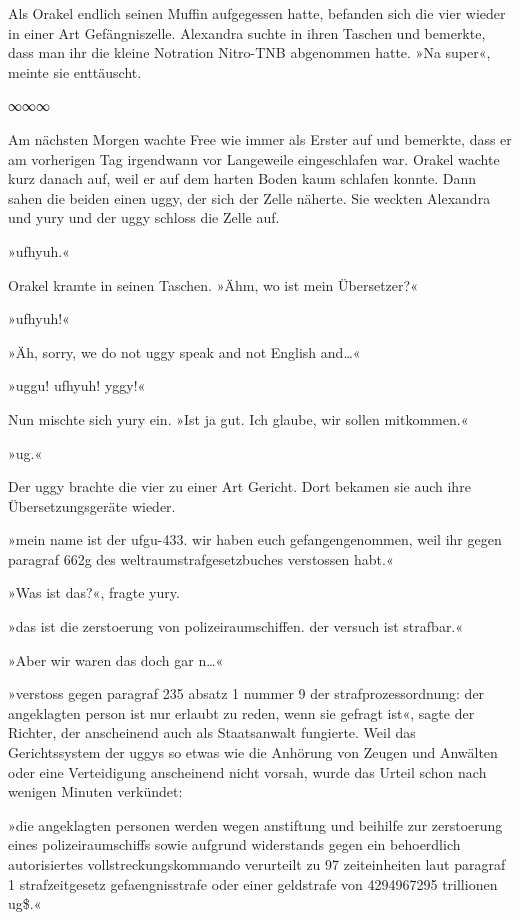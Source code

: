 Als Orakel endlich seinen Muffin aufgegessen hatte, befanden sich die vier wieder in einer Art Gefängniszelle. Alexandra suchte in ihren Taschen und bemerkte, dass man ihr die kleine Notration Nitro-TNB abgenommen hatte. »Na super«, meinte sie enttäuscht.

\begin{center}
    ∞∞∞
\end{center}

Am nächsten Morgen wachte Free wie immer als Erster auf und bemerkte, dass er am vorherigen Tag irgendwann vor Langeweile eingeschlafen war. Orakel wachte kurz danach auf, weil er auf dem harten Boden kaum schlafen konnte. Dann sahen die beiden einen uggy, der sich der Zelle näherte. Sie weckten Alexandra und yury und der uggy schloss die Zelle auf.

»ufhyuh.«

Orakel kramte in seinen Taschen. »Ähm, wo ist mein Übersetzer?«

»ufhyuh!«

»Äh, sorry, we do not uggy speak and not English and…«

»uggu! ufhyuh! yggy!«

Nun mischte sich yury ein. »Ist ja gut. Ich glaube, wir sollen mitkommen.«

»ug.«

Der uggy brachte die vier zu einer Art Gericht. Dort bekamen sie auch ihre Übersetzungsgeräte wieder.

»mein name ist der ufgu-433. wir haben euch gefangengenommen, weil ihr gegen paragraf 662g des weltraumstrafgesetzbuches verstossen habt.«

»Was ist das?«, fragte yury.

»das ist die zerstoerung von polizeiraumschiffen. der versuch ist strafbar.«

»Aber wir waren das doch gar n…«

»verstoss gegen paragraf 235 absatz 1 nummer 9 der strafprozessordnung: der angeklagten person ist nur erlaubt zu reden, wenn sie gefragt ist«, sagte der Richter, der anscheinend auch als Staatsanwalt fungierte. Weil das Gerichtssystem der uggys so etwas wie die Anhörung von Zeugen und Anwälten oder eine Verteidigung anscheinend nicht vorsah, wurde das Urteil schon nach wenigen Minuten verkündet:

»die angeklagten personen werden wegen anstiftung und beihilfe zur zerstoerung eines polizeiraumschiffs sowie aufgrund widerstands gegen ein behoerdlich autorisiertes vollstreckungskommando verurteilt zu 97 zeiteinheiten laut paragraf 1 strafzeitgesetz gefaengnisstrafe oder einer geldstrafe von 4294967295 trillionen ug\$.«

